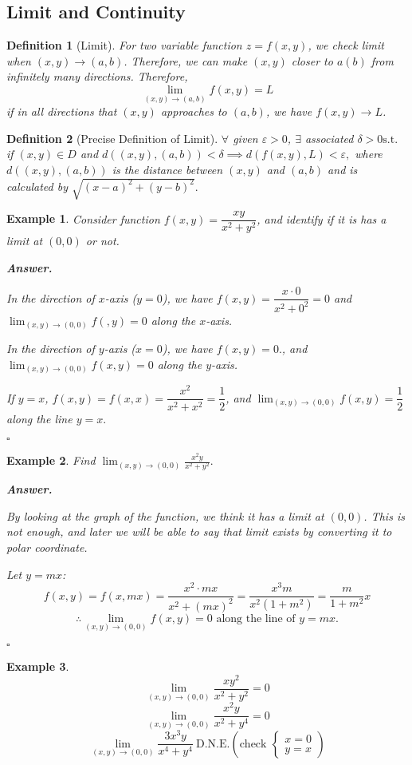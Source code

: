\documentclass[12pt,a4paper]{article}
\newtheorem{df}{Definition}[subsection]
\newtheorem{eg}{Example}[subsection]
\newenvironment*{ans}{\par\indent\textbf{\textit{Answer. }}\par}{\par\hfill{$\square$}\par}
\def\DNE{\mathrm{D.N.E.}}
\def\st{\mathrm{ s.t. }}
\begin{document}
\subsection{Limit and Continuity}
\begin{df}[Limit]
	For two variable function $z=f(x,y)$, we check limit when $(x,y)\to(a,b)$. Therefore, we can make $(x,y)$ closer to $a(b)$ from infinitely many directions. Therefore, \[\lim_{(x,y)\to(a,b)}f(x,y)=L\] if in all directions that $(x,y)$ approaches to $(a,b)$, we have $f(x,y)\to L$.	
\end{df}
\begin{df}[Precise Definition of Limit]
	$\forall$ given $\varepsilon>0$, $\exists$ associated $\delta>0\st$ if $(x,y)\in D$ and $d((x,y),(a,b))<\delta\implies d(f(x,y),L)<\varepsilon,$ where $d((x,y),(a,b))$ is the distance between $(x,y)$ and $(a,b)$ and is calculated by $\sqrt{(x-a)^2+(y-b)^2}.$
\end{df}
\begin{eg}
	Consider function $f(x,y)=\dfrac{xy}{x^2+y^2}$, and identify if it is has a limit at $(0,0)$ or not. 
	\begin{ans}
		In the direction of $x$-axis ($y=0$), we have $f(x,y)=\dfrac{x\cdot0}{x^2+0^2}=0$ and $\displaystyle\lim_{(x,y)\to(0,0)}f(,y)=0$ along the $x$-axis.\par In the direction of $y$-axis ($x=0$), we have $f(x,y)=0.$, and $\displaystyle\lim_{(x,y)\to(0,0)}f(x,y)=0$ along the $y$-axis.\par If $y=x$, $f(x,y)=f(x,x)=\dfrac{x^2}{x^2+x^2}=\dfrac{1}{2}$, and $\displaystyle\lim_{(x,y)\to(0,0)}f(x,y)=\dfrac{1}{2}$ along the line $y=x.$
	\end{ans}
\end{eg}
\begin{eg}
	Find $\displaystyle\lim_{(x,y)\to(0,0)}\frac{x^2y}{x^2+y^2}.$
	\begin{ans}
		By looking at the graph of the function, we think it has a limit at $(0,0)$. This is not enough, and later we will be able to say that limit exists by converting it to polar coordinate.\par Let $y=mx$: \[f(x,y)=f(x,mx)=\frac{x^2\cdot mx}{x^2+(mx)^2}=\frac{x^3m}{x^2(1+m^2)}=\frac{m}{1+m^2}x\]\[\therefore\lim_{(x,y)\to(0,0)}f(x,y)=0\text{ along the line of }y=mx.\]
	\end{ans}
\end{eg}
\begin{eg}
	\[\lim_{(x,y)\to(0,0)}\frac{xy^2}{x^2+y^2}=0\]	
	\[\lim_{(x,y)\to(0,0)}\frac{x^2y}{x^2+y^4}=0\]
	\[\lim_{(x,y)\to(0,0)}\frac{3x^3y}{x^4+y^4}\ \DNE \left(\text{check }\begin{cases}x=0\\y=x\end{cases}\right)\]
\end{eg}
\end{document}
